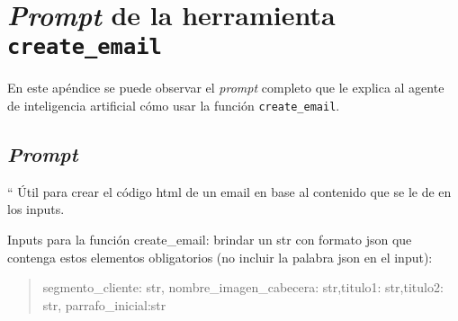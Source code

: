 
\chapter{\textit{Prompt} de la herramienta \texttt{create\_email}} %

\label{AppendixA} %

En este apéndice se puede observar el \textit{prompt} completo que le explica al agente de inteligencia artificial cómo usar la función \texttt{create\_email}.

\section{\textit{Prompt} }

`` Útil para crear el código html de un email en base al contenido que se le de en los inputs.

    Inputs para la función create\_email: brindar un str con formato json que contenga estos elementos obligatorios (no incluir la palabra json en el input):
        \begin{quote} 
        segmento\_cliente: str, nombre\_imagen\_cabecera: str,titulo1: str,titulo2: str, parrafo\_inicial:str
        \end{quote}
        
